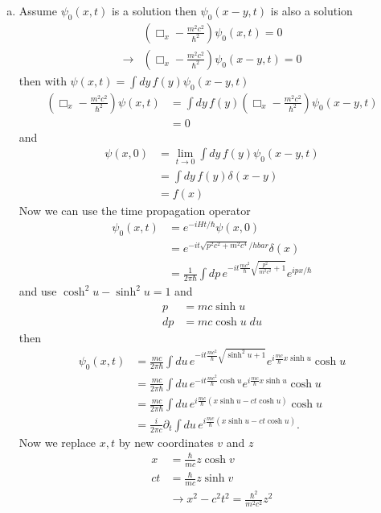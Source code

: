\documentclass[10pt,a4paper]{book}
\theoremstyle{definition}
\begin{document}
\begin{enumerate}[(a)]
\item Assume $\psi_0(x,t)$ is a solution then $\psi_0(x-y,t)$ is also a solution
\begin{align}
&\left(\Box_x-\frac{m^2c^2}{\hbar^2}\right)\psi_0(x,t)=0\\
\rightarrow&\left(\Box_x-\frac{m^2c^2}{\hbar^2}\right)\psi_0(x-y,t)=0
\end{align}
then with $\psi(x,t)=\int dy\,f(y)\psi_0(x-y,t)$
\begin{align}
\left(\Box_x-\frac{m^2c^2}{\hbar^2}\right)\psi(x,t)
&=\int dy\,f(y)\left(\Box_x-\frac{m^2c^2}{\hbar^2}\right)\psi_0(x-y,t)\\
&=0
\end{align}
and 
\begin{align}
\psi(x,0)&=\lim_{t\rightarrow0}\int dy\,f(y)\psi_0(x-y,t)\\
&=\int dy\,f(y)\delta(x-y)\\
&=f(x)
\end{align}
Now we can use the time propagation operator
\begin{align}
\psi_0(x,t)
&=e^{-iHt/\hbar}\psi(x,0)\\
&=e^{-it\sqrt{p^2c^2+m^2c^4}/hbar}\delta(x)\\
&=\frac{1}{2\pi\hbar}\int dp\, e^{-it\frac{mc^2}{\hbar}\sqrt{\frac{p^2}{m^2c^2}+1}}e^{ipx/\hbar}
\end{align}
and use $\cosh^2u-\sinh^2u=1$ and
\begin{align}
p&=mc\sinh u\\
dp&=mc\cosh u\;du
\end{align}
then
\begin{align}
\psi_0(x,t)
&=\frac{mc}{2\pi\hbar}\int du\, e^{-it\frac{mc^2}{\hbar}\sqrt{\sinh^2 u+1}}e^{i\frac{mc}{\hbar}x\sinh u}\cosh u\\
&=\frac{mc}{2\pi\hbar}\int du\, e^{-it\frac{mc^2}{\hbar}\cosh u}e^{i\frac{mc}{\hbar}x\sinh u}\cosh u\\
&=\frac{mc}{2\pi\hbar}\int du\,e^{i\frac{mc}{\hbar}(x\sinh u-ct\cosh u)}\cosh u\\
&=\frac{i}{2\pi c}\partial_t\int du\,e^{i\frac{mc}{\hbar}(x\sinh u-ct\cosh u)}.
\end{align}
Now we replace $x, t$ by new coordinates $v$ and $z$
\begin{align}
x&=\frac{\hbar}{mc}z\cosh v\\
ct&=\frac{\hbar}{mc}z\sinh v\\
&\rightarrow x^2-c^2t^2=\frac{\hbar^2}{m^2c^2}z^2
\end{align}

\end{enumerate}
\end{document}
